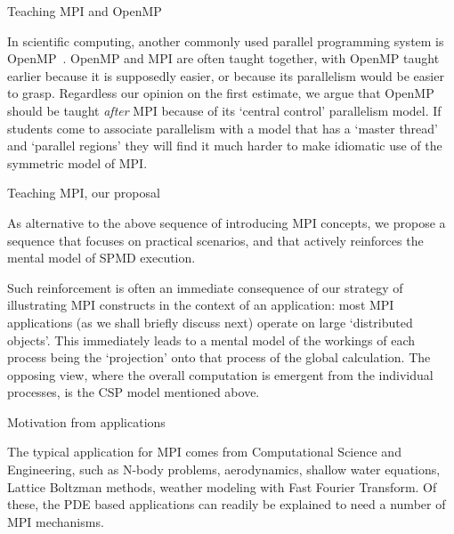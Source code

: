  {Teaching MPI and OpenMP}

In scientific computing, another commonly used parallel programming
system is OpenMP~\cite{OpenMP:spec}. OpenMP and MPI are often taught
together, with OpenMP taught earlier
because it is supposedly easier, or because its parallelism would be
easier to grasp. Regardless our opinion on the first estimate, we
argue that OpenMP should be taught \emph{after} MPI because of its
`central control' parallelism model. If students come to associate
parallelism with a model that has a `master thread' and `parallel
regions' they will find it much harder to make idiomatic use of the
symmetric model of MPI.

 {Teaching MPI, our proposal}
\label{sec:mpi-better}

As alternative to the above sequence of introducing
MPI concepts, we propose a sequence that focuses
on practical scenarios, and that actively reinforces
the mental model of \ac{SPMD} execution.

Such reinforcement is often an immediate consequence of our strategy
of illustrating MPI constructs in the context of an application: most
MPI applications (as we shall briefly discuss next) operate on large
`distributed objects'. This immediately leads to a mental model of the
workings of each process being the `projection' onto that process of
the global calculation. The opposing view, where the overall
computation is emergent from the individual processes, is the \ac{CSP} model
mentioned above.

 {Motivation from applications}
\label{sec:par-app}

The typical application for MPI comes from Computational Science and
Engineering, such as N-body problems, aerodynamics, shallow water
equations, Lattice Boltzman methods, weather modeling with Fast
Fourier Transform. Of these, the \ac{PDE} based applications can
readily be explained to need a number of MPI mechanisms.

